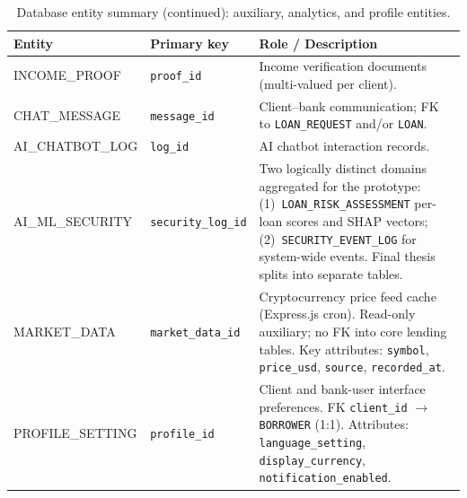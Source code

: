 \documentclass[12pt,a4paper]{report}
\newcommand{\tableheadcolor}{\rowcolor{TableHeadBg}}
\begin{document}
\newpage
\begin{table}[H]
\centering
\caption[Database entity summary (continued)]{Database entity summary (continued): auxiliary, analytics, and profile entities.}
\small
\begin{tabular}{@{}p{2.6cm}p{3.4cm}p{7.0cm}@{}}
\toprule
\tableheadcolor
\textbf{Entity} & \textbf{Primary key} & \textbf{Role / Description} \\
\midrule
INCOME\_PROOF & \texttt{proof\_id} & Income verification documents (multi-valued per client). \\
CHAT\_MESSAGE & \texttt{message\_id} & Client--bank communication; FK to \texttt{LOAN\_REQUEST} and/or \texttt{LOAN}. \\
AI\_CHATBOT\_LOG & \texttt{log\_id} & AI chatbot interaction records. \\
AI\_ML\_SECURITY & \texttt{security\_log\_id} & Two logically distinct domains aggregated for the prototype: (1)~\texttt{LOAN\_RISK\_ASSESSMENT} per-loan scores and SHAP vectors; (2)~\texttt{SECURITY\_EVENT\_LOG} for system-wide events. Final thesis splits into separate tables. \\
MARKET\_DATA & \texttt{market\_data\_id} & Cryptocurrency price feed cache (Express.js cron). Read-only auxiliary; no FK into core lending tables. Key attributes: \texttt{symbol}, \texttt{price\_usd}, \texttt{source}, \texttt{recorded\_at}. \\
PROFILE\_SETTING & \texttt{profile\_id} & Client and bank-user interface preferences. FK \texttt{client\_id} $\to$ \texttt{BORROWER} (1:1). Attributes: \texttt{language\_setting}, \texttt{display\_currency}, \texttt{notification\_enabled}. \\
\bottomrule
\end{tabular}
\end{table}
\end{document}
